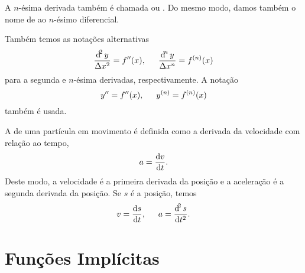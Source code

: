 A $n$-ésima derivada também é chamada  ou . Do mesmo modo, damos também o nome de
 ao
$n$-ésimo diferencial.

Também temos as notações alternativas
$$
  \frac{\dif^2y}{\dx^2} = f''(x), \hspace{1.5em}
  \frac{\dif^ny}{\dx^n} = f^{(n)}(x)
$$
para a segunda e $n$-ésima derivadas, respectivamente. A notação
$$
  y'' = f''(x), \hspace{1.5em} y^{(n)} = f^{(n)}(x)
$$
também é usada.

%
%

A  de uma partícula em movimento é definida como a derivada
da velocidade com relação ao tempo,
$$
  a = \frac{\dv}{\dt}.
$$
Deste modo, a velocidade é a primeira derivada da posição e a aceleração
é a segunda derivada da posição. Se $s$ é a posição, temos
$$
  v = \frac{\dif s}{\dt}, \hspace{1.5em} a = \frac{\dif^2s}{\dt^2}.
$$

\section{Funções Implícitas}
\label{sec:implicitfunc}

\begin{chapterproblems}
\end{chapterproblems}



